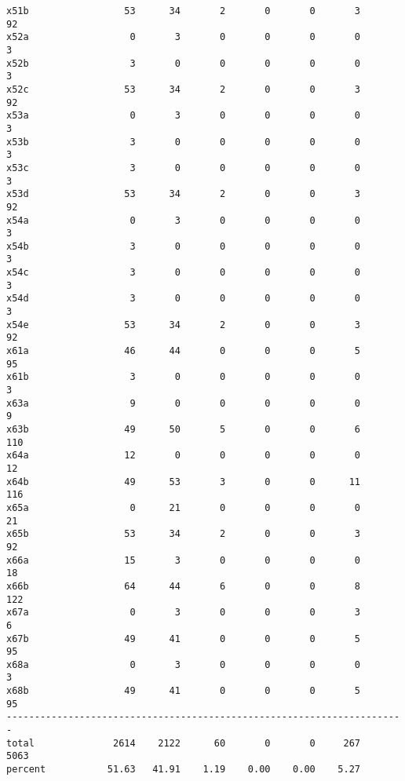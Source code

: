 \documentclass[11pt]{article}
\begin{document}
\begin{scriptsize}
\begin{verbatim}
x51b                 53      34       2       0       0       3      92
x52a                  0       3       0       0       0       0       3
x52b                  3       0       0       0       0       0       3
x52c                 53      34       2       0       0       3      92
x53a                  0       3       0       0       0       0       3
x53b                  3       0       0       0       0       0       3
x53c                  3       0       0       0       0       0       3
x53d                 53      34       2       0       0       3      92
x54a                  0       3       0       0       0       0       3
x54b                  3       0       0       0       0       0       3
x54c                  3       0       0       0       0       0       3
x54d                  3       0       0       0       0       0       3
x54e                 53      34       2       0       0       3      92
x61a                 46      44       0       0       0       5      95
x61b                  3       0       0       0       0       0       3
x63a                  9       0       0       0       0       0       9
x63b                 49      50       5       0       0       6     110
x64a                 12       0       0       0       0       0      12
x64b                 49      53       3       0       0      11     116
x65a                  0      21       0       0       0       0      21
x65b                 53      34       2       0       0       3      92
x66a                 15       3       0       0       0       0      18
x66b                 64      44       6       0       0       8     122
x67a                  0       3       0       0       0       3       6
x67b                 49      41       0       0       0       5      95
x68a                  0       3       0       0       0       0       3
x68b                 49      41       0       0       0       5      95
-----------------------------------------------------------------------
total              2614    2122      60       0       0     267    5063
percent           51.63   41.91    1.19    0.00    0.00    5.27


\end{verbatim}
\end{scriptsize}
\end{document}
